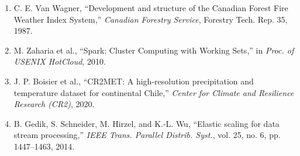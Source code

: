 \documentclass[11pt,a4paper]{article}
\begin{document}
\begin{enumerate}[leftmargin=6mm]
    \item C. E. Van Wagner, ``Development and structure of the Canadian Forest Fire Weather Index System,'' \textit{Canadian Forestry Service}, Forestry Tech. Rep. 35, 1987.
    \item M. Zaharia et al., ``Spark: Cluster Computing with Working Sets,'' in \textit{Proc. of USENIX HotCloud}, 2010.
    \item J. P. Boisier et al., ``CR2MET: A high-resolution precipitation and temperature dataset for continental Chile,'' \textit{Center for Climate and Resilience Research (CR2)}, 2020.
    \item B. Gedik, S. Schneider, M. Hirzel, and K.-L. Wu, ``Elastic scaling for data stream processing,'' \textit{IEEE Trans. Parallel Distrib. Syst.}, vol. 25, no. 6, pp. 1447--1463, 2014.
\end{enumerate}
\end{document}
